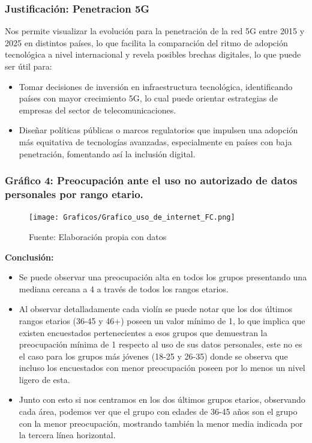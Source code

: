 \documentclass[12pt, a4paper]{article}
\begin{document}
\subsubsection*{Justificación: Penetracion 5G}
Nos permite visualizar la evolución para la penetración de la red 5G entre 2015 y 2025 en distintos países, lo que facilita la comparación del ritmo de adopción tecnológica a nivel internacional y revela posibles brechas digitales, lo que puede ser útil para:
\begin{itemize}
    \item Tomar decisiones de inversión en infraestructura tecnológica, identificando países con mayor crecimiento 5G, lo cual puede orientar estrategias de empresas del sector de telecomunicaciones.
    \item Diseñar políticas públicas o marcos regulatorios que impulsen una adopción más equitativa de tecnologías avanzadas, especialmente en países con baja penetración, fomentando así la inclusión digital.
\end{itemize}

\subsubsection*{Gráfico 4: Preocupación ante el uso no autorizado de datos personales por rango etario.}
\begin{figure}[H]
    \centering
    \texttt{[image: Graficos/Grafico\_uso\_de\_internet\_FC.png]}
    \caption[5]{Fuente: Elaboración propia con datos}
\end{figure}

\textbf{Conclusión:}  
\begin{itemize}
    \item Se puede observar una preocupación alta en todos los grupos presentando una mediana cercana a 4 a través de todos los rangos etarios.
    \item Al observar detalladamente cada violín se puede notar que los dos últimos rangos etarios (36-45 y 46+) poseen un valor mínimo de 1, lo que implica que existen encuestados pertenecientes a esos grupos que demuestran la preocupación mínima de 1 respecto al uso de sus datos personales, este no es el caso para los grupos más jóvenes (18-25 y 26-35) donde se observa que incluso los encuestados con menor preocupación poseen por lo menos un nivel ligero de esta.
    \item Junto con esto si nos centramos en los dos últimos grupos etarios, observando cada área, podemos ver que el grupo con edades de 36-45 años son el grupo con la menor preocupación, mostrando también la menor media indicada por la tercera línea horizontal.
\end{itemize}
\end{document}
